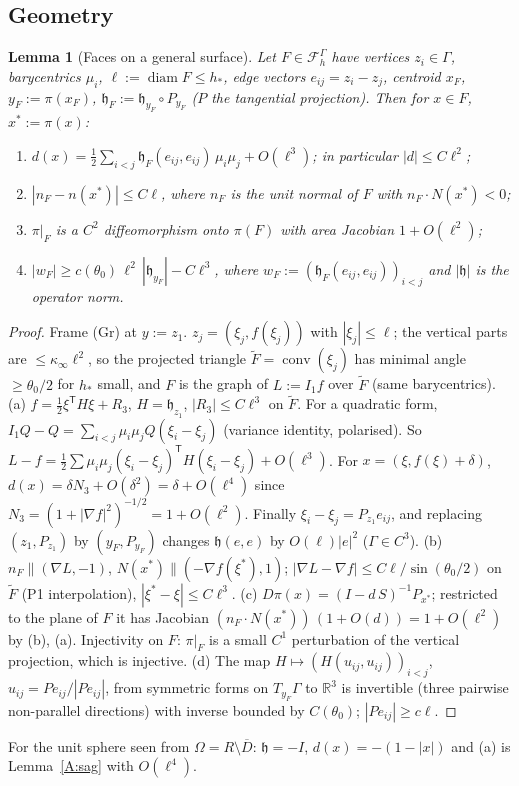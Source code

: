 \documentclass[11pt]{article}
\newtheorem{lemma}[theorem]{Lemma}
\theoremstyle{definition}
\newcommand{\R}{\mathbb R}
\newcommand{\FG}{\mathcal F_h^\Gamma}
\newcommand{\hh}{\mathfrak h}
\DeclareMathOperator{\diam}{diam}
\begin{document}
\subsection{Geometry}
\begin{lemma}[Faces on a general surface]\label{B:face}
Let $F\in\FG$ have vertices $z_i\in\Gamma$, barycentrics $\mu_i$, $\ell:=\diam F\le h_\ast$, edge vectors $e_{ij}=z_i-z_j$, centroid $x_F$, $y_F:=\pi(x_F)$, $\hh_F:=\hh_{y_F}\circ P_{y_F}$ ($P$ the tangential projection). Then for $x\in F$, $x^\ast:=\pi(x)$:
\begin{enumerate}[label=(\alph*)]
\item $d(x)=\frac12\sum_{i<j}\hh_F(e_{ij},e_{ij})\,\mu_i\mu_j+O(\ell^3)$; in particular $|d|\le C\ell^2$;
\item $|n_F-n(x^\ast)|\le C\ell$, where $n_F$ is the unit normal of $F$ with $n_F\cdot N(x^\ast)<0$;
\item $\pi|_F$ is a $C^2$ diffeomorphism onto $\pi(F)$ with area Jacobian $1+O(\ell^2)$;
\item $|w_F|\ge c(\theta_0)\,\ell^2\,|\hh_{y_F}|-C\ell^3$, where $w_F:=(\hh_F(e_{ij},e_{ij}))_{i<j}$ and $|\hh|$ is the operator norm.
\end{enumerate}
\end{lemma}
\begin{proof}
Frame (Gr) at $y:=z_1$. $z_j=(\xi_j,f(\xi_j))$ with $|\xi_j|\le\ell$; the vertical parts are $\le\kappa_\infty\ell^2$, so the projected triangle $\tilde F=\operatorname{conv}(\xi_j)$ has minimal angle $\ge\theta_0/2$ for $h_\ast$ small, and $F$ is the graph of $L:=I_1f$ over $\tilde F$ (same barycentrics).
(a) $f=\frac12\xi^{\mathsf T}H\xi+R_3$, $H=\hh_{z_1}$, $|R_3|\le C\ell^3$ on $\tilde F$. For a quadratic form, $I_1Q-Q=\sum_{i<j}\mu_i\mu_j Q(\xi_i-\xi_j)$ (variance identity, polarised). So $L-f=\frac12\sum\mu_i\mu_j(\xi_i-\xi_j)^{\mathsf T}H(\xi_i-\xi_j)+O(\ell^3)$. For $x=(\xi,f(\xi)+\delta)$, $d(x)=\delta N_3+O(\delta^2)=\delta+O(\ell^4)$ since $N_3=(1+|\nabla f|^2)^{-1/2}=1+O(\ell^2)$. Finally $\xi_i-\xi_j=P_{z_1}e_{ij}$, and replacing $(z_1,P_{z_1})$ by $(y_F,P_{y_F})$ changes $\hh(e,e)$ by $O(\ell)|e|^2$ ($\Gamma\in C^3$).
(b) $n_F\parallel(\nabla L,-1)$, $N(x^\ast)\parallel(-\nabla f(\xi^\ast),1)$; $|\nabla L-\nabla f|\le C\ell/\sin(\theta_0/2)$ on $\tilde F$ (P1 interpolation), $|\xi^\ast-\xi|\le C\ell^3$.
(c) $D\pi(x)=(I-d\,S)^{-1}P_{x^\ast}$; restricted to the plane of $F$ it has Jacobian $(n_F\cdot N(x^\ast))\,(1+O(d))=1+O(\ell^2)$ by (b), (a). Injectivity on $F$: $\pi|_F$ is a small $C^1$ perturbation of the vertical projection, which is injective.
(d) The map $H\mapsto(H(u_{ij},u_{ij}))_{i<j}$, $u_{ij}=P e_{ij}/|Pe_{ij}|$, from symmetric forms on $T_{y_F}\Gamma$ to $\R^3$ is invertible (three pairwise non-parallel directions) with inverse bounded by $C(\theta_0)$; $|Pe_{ij}|\ge c\ell$.
\end{proof}
For the unit sphere seen from $\Omega=R\setminus\overline D$: $\hh=-I$, $d(x)=-(1-|x|)$ and (a) is Lemma~\ref{A:sag} with $O(\ell^4)$.
\end{document}

